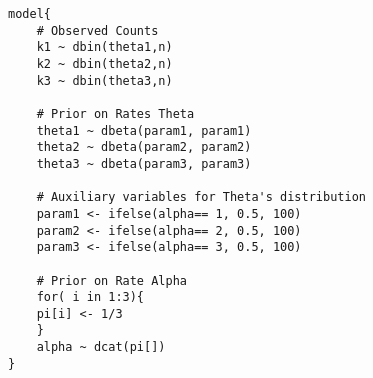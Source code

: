 \begin{lstlisting}[frame=single]
model{  
	# Observed Counts
	k1 ~ dbin(theta1,n)
	k2 ~ dbin(theta2,n)
	k3 ~ dbin(theta3,n)

	# Prior on Rates Theta
	theta1 ~ dbeta(param1, param1)
	theta2 ~ dbeta(param2, param2)
	theta3 ~ dbeta(param3, param3)

	# Auxiliary variables for Theta's distribution
	param1 <- ifelse(alpha== 1, 0.5, 100)
	param2 <- ifelse(alpha== 2, 0.5, 100)
	param3 <- ifelse(alpha== 3, 0.5, 100)

	# Prior on Rate Alpha
	for( i in 1:3){
	pi[i] <- 1/3
	}
	alpha ~ dcat(pi[])	
}
\end{lstlisting}


